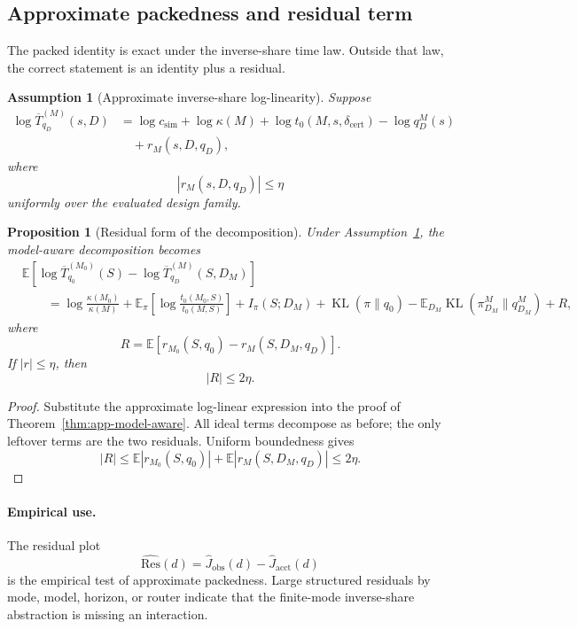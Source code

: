\documentclass{article}
\newtheorem{assumption}{Assumption}
\newtheorem{proposition}{Proposition}
\DeclareMathOperator{\KL}{KL}
\newcommand{\E}{\mathbb{E}}
\begin{document}
\subsection{Approximate packedness and residual term}

The packed identity is exact under the inverse-share time law.
Outside that law, the correct statement is an identity plus a residual.

\begin{assumption}[Approximate inverse-share log-linearity]
\label{ass:app-approx-log-linear}
Suppose
\[
\begin{aligned}
    \log \overline T^{(M)}_{q_D}(s,D)
    &=
    \log c_{\mathrm{sim}}
    +
    \log\kappa(M)
    +
    \log t_0(M,s,\delta_{\mathrm{cert}})
    -
    \log q_D^M(s)
    \\
    &\quad
    +
    r_M(s,D,q_D),
\end{aligned}
\]
where
\[
    |r_M(s,D,q_D)|\le \eta
\]
uniformly over the evaluated design family.
\end{assumption}

\begin{proposition}[Residual form of the decomposition]
\label{prop:app-residual-decomp}
Under Assumption~\ref{ass:app-approx-log-linear}, the model-aware decomposition becomes
\[
\begin{aligned}
&\E[
    \log \overline T^{(M_0)}_{q_0}(S)
    -
    \log \overline T^{(M)}_{q_D}(S,D_M)
]
\\
&\qquad =
\log\frac{\kappa(M_0)}{\kappa(M)}
+
\E_\pi
\left[
    \log\frac{t_0(M_0,S)}{t_0(M,S)}
\right]
+
I_\pi(S;D_M)
+
\KL(\pi\|q_0)
-
\E_{D_M}\KL(\pi_{D_M}^M\|q_{D_M}^M)
+
R,
\end{aligned}
\]
where
\[
    R
    =
    \E[r_{M_0}(S,q_0)-r_M(S,D_M,q_D)].
\]
If \(|r|\le\eta\), then
\[
    |R|\le 2\eta.
\]
\end{proposition}

\begin{proof}
Substitute the approximate log-linear expression into the proof of
Theorem~\ref{thm:app-model-aware}.  All ideal terms decompose as before; the only leftover
terms are the two residuals.  Uniform boundedness gives
\[
    |R|
    \le
    \E|r_{M_0}(S,q_0)|+\E|r_M(S,D_M,q_D)|
    \le 2\eta.
\]
\end{proof}

\paragraph{Empirical use.}
The residual plot
\[
    \widehat{\mathrm{Res}}(d)
    =
    \widehat J_{\mathrm{obs}}(d)-\widehat J_{\mathrm{acct}}(d)
\]
is the empirical test of approximate packedness.
Large structured residuals by mode, model, horizon, or router indicate that the finite-mode
inverse-share abstraction is missing an interaction.
\end{document}
